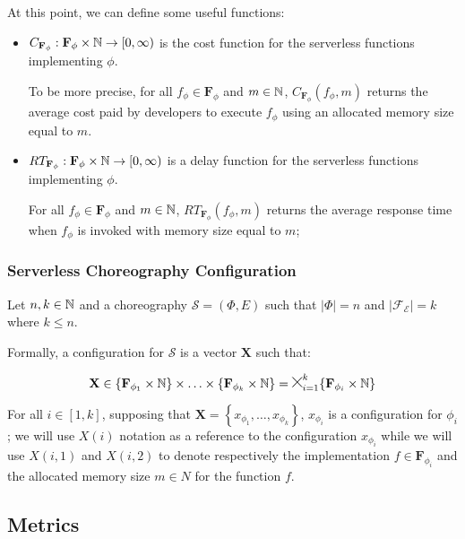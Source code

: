At this point, we can define some useful functions:

\begin{itemize}	
	\item $C_{\textbf{F}_{\phi}} : \textbf{F}_{\phi} \times \mathbb{N} \to \left[ 0, \infty \right)$ is the cost function for the serverless functions implementing $\phi$.
	
	To be more precise, for all $f_{\phi} \in \textbf{F}_{\phi}$ and $m \in \mathbb{N}$, $C_{\textbf{F}_{\phi}}(f_{\phi}, m)$ returns the average cost paid by developers to execute $f_{\phi}$ using an allocated memory size equal to $m$.
	
	
	\item $RT_{\textbf{F}_{\phi}} : \textbf{F}_{\phi} \times \mathbb{N} \to \left[ 0, \infty \right)$ is a delay function for the serverless functions implementing $\phi$.
	
	For all $f_{\phi} \in \textbf{F}_{\phi}$ and $m \in \mathbb{N}$, $RT_{\textbf{F}_{\phi}}(f_{\phi}, m)$ returns the average response time when $f_{\phi}$ is invoked with memory size equal to $m$;
\end{itemize}

\subsubsection{Serverless Choreography Configuration}

Let $n,k \in \mathbb{N}$ and a choreography $\mathcal{S} = (\Phi,E)$ such that $|\Phi| = n$ and $|\mathscr{F_E}| = k$ where $k \leq n$.

Formally, a configuration for $\mathcal{S}$ is a vector $\textbf{X}$ such that:

\begin{equation}
\textbf{X} \in \lbrace \textbf{F}_{\phi_{1}} \times \mathbb{N} \rbrace \times \ldots \times \lbrace \textbf{F}_{\phi_{k}} \times \mathbb{N} \rbrace = \Cross_{i = 1}^k \lbrace \textbf{F}_{\phi_{i}} \times \mathbb{N} \rbrace
\end{equation}

For all $i \in \left[ 1, k \right]$, supposing that $\textbf{X} = \left\lbrace x_{\phi_{1}}, \ldots, x_{\phi_{k}} \right\rbrace $, $x_{\phi_{i}}$ is a configuration for $\phi_{i}$; we will use $X(i)$ notation as a reference to the configuration $x_{\phi_{i}}$ while we will use $X(i,1)$ and $X(i,2)$ to denote respectively the implementation $f \in \textbf{F}_{\phi_i}$ and the allocated memory size $m \in N$ for the function $f$.

\subsection{Metrics}

